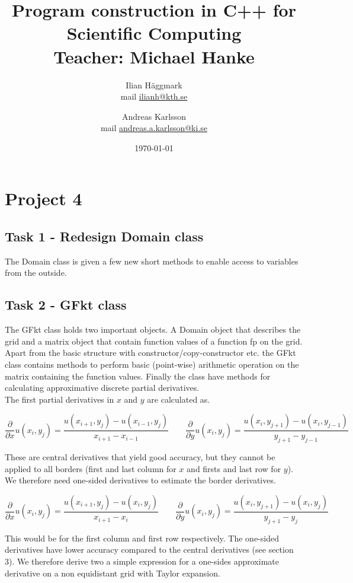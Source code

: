 \documentclass[paper=a4, fontsize=12pt]{article} %
\title{Program construction in C++ for Scientific Computing \\ Teacher: Michael Hanke}
\author{Ilian H{\"a}ggmark \\ mail \href{mailto:ilianh@kth.se}{ilianh@kth.se}
  \and Andreas Karlsson \\ mail \href{mailto:andreas.a.karlsson@ki.se}{andreas.a.karlsson@ki.se} }
\date{\normalsize\today} %
\begin{document}
\maketitle %

\section*{Project 4}
\subsection*{Task 1 - Redesign Domain class}

The Domain class is given a few new short methods to enable access to variables from the outside.\\


\subsection*{Task 2 - GFkt class}

The GFkt class holds two important objects. A Domain object that describes the grid and a matrix object that contain function values of a function fp on the grid. Apart from the basic structure with constructor/copy-constructor etc. the GFkt class contains methods to perform basic (point-wise) arithmetic operation on the matrix containing the function values. Finally the class have methods for calculating approximative discrete partial derivatives. \\

The first partial derivatives in $x$ and $y$ are calculated as.

$$ \frac{\partial}{\partial x} u(x_i,y_j)  = \frac{u(x_{i+1},y_j)-u(x_{i-1},y_j)}{x_{i+1} - x_{i-1}} \qquad  \frac{\partial}{\partial y} u(x_i,y_j)  = \frac{u(x_{i},y_{j+1})-u(x_{i},y_{j-1})}{y_{j+1} - y_{j-1}}$$ 

These are central derivatives that yield good accuracy, but they cannot be applied to all borders (first and last column for $x$ and firsts and last row for $y$). We therefore need one-sided derivatives to estimate the border derivatives.

$$ \frac{\partial}{\partial x} u(x_i,y_j)  = \frac{u(x_{i+1},y_j)-u(x_{i},y_j)}{x_{i+1} - x_{i}} \qquad  \frac{\partial}{\partial y} u(x_i,y_j)  = \frac{u(x_{i},y_{j+1})-u(x_{i},y_{j})}{y_{j+1} - y_{j}}$$

This would be for the first column and first row respectively. The one-sided derivatives have lower accuracy compared to the central derivatives (see section 3). We therefore derive two a simple expression for a one-sides approximate derivative on a non equidistant grid with Taylor expansion. 
\end{document}
